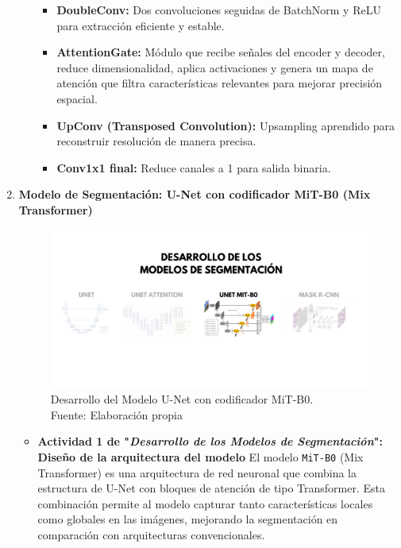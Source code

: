 \begin{enumerate}
\begin{itemize}
  \begin{itemize}
    \item \textbf{DoubleConv:} Dos convoluciones seguidas de BatchNorm y ReLU para extracción eficiente y estable.
    \item \textbf{AttentionGate:} Módulo que recibe señales del encoder y decoder, reduce dimensionalidad, aplica activaciones y genera un mapa de atención que filtra características relevantes para mejorar precisión espacial.
    \item \textbf{UpConv (Transposed Convolution):} Upsampling aprendido para reconstruir resolución de manera precisa.
    \item \textbf{Conv1x1 final:} Reduce canales a 1 para salida binaria.
  \end{itemize}
  \end{itemize}
  \newpage
  \item \textbf{Modelo de Segmentación: U-Net con codificador MiT-B0 (Mix Transformer)}
  \begin{figure}[H]
	\begin{center}
		\includegraphics[width=1\textwidth]{4/figures/desunetmit.png}
		\caption[Desarrollo del Modelo U-Net con codificador MiT-B0]{Desarrollo del Modelo U-Net con codificador MiT-B0.\\
		Fuente: Elaboración propia}
		\label{4:figdesunetmit}
	\end{center}
\end{figure}
  \begin{itemize}

  \item\textbf{Actividad 1 de "\textit{Desarrollo de los Modelos de Segmentación}": Diseño de la arquitectura del modelo}
  El modelo \texttt{MiT-B0} (Mix Transformer) es una arquitectura de red neuronal que combina la estructura de U-Net con bloques de atención de tipo Transformer. Esta combinación permite al modelo capturar tanto características locales como globales en las imágenes, mejorando la segmentación en comparación con arquitecturas convencionales.


\end{itemize}
\end{enumerate}

